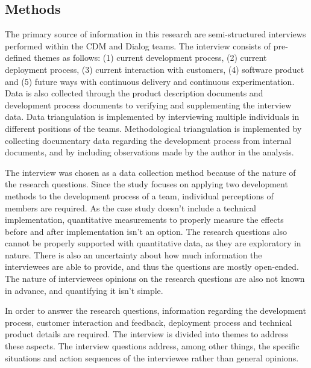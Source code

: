 \documentclass[english, grading]{tktltiki2}
\theoremstyle{definition}
\theoremstyle{remark}
\begin{document}
\subsection{Methods} %
The primary source of information in this research are semi-structured interviews \cite{runeson2009guidelines} performed within the CDM and Dialog teams. The interview consists of pre-defined themes as follows: (1) current development process, (2) current deployment process, (3) current interaction with customers, (4) software product and (5) future ways with continuous delivery and continuous experimentation. Data is also collected through the product description documents and development process documents to verifying and supplementing the interview data. Data triangulation is implemented by interviewing multiple individuals in different positions of the teams. Methodological triangulation is implemented by collecting documentary data regarding the development process from internal documents, and by including observations made by the author in the analysis. 

The interview was chosen as a data collection method because of the nature of the research questions. Since the study focuses on applying two development methods to the development process of a team, individual perceptions of members are required. As the case study doesn't include a technical implementation, quantitative measurements to properly measure the effects before and after implementation isn't an option. The research questions also cannot be properly supported with quantitative data, as they are exploratory in nature. There is also an uncertainty about how much information the interviewees are able to provide, and thus the questions are mostly open-ended. The nature of interviewees opinions on the research questions are also not known in advance, and quantifying it isn't simple. 

In order to answer the research questions, information regarding the development process, customer interaction and feedback, deployment process and technical product details are required. The interview is divided into themes to address these aspects. The interview questions address, among other things, the specific situations and action sequences of the interviewee rather than general opinions. 
\end{document}
